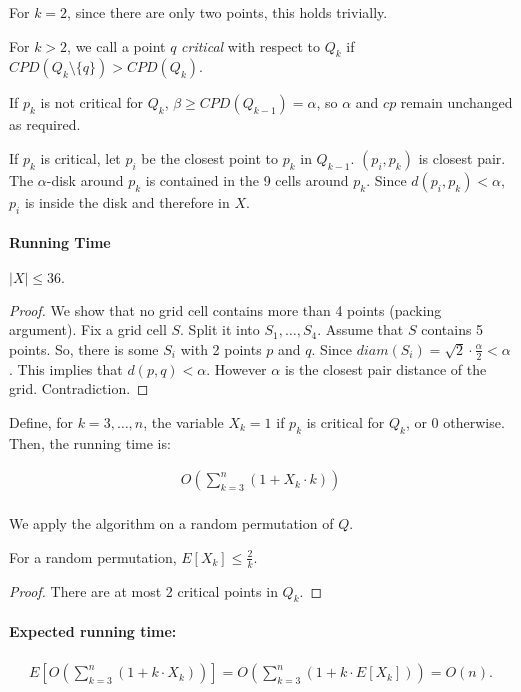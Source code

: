 For $k = 2$, since there are only two points, this holds trivially.

For $k > 2$, we call a point $q$ \emph{critical} with respect to $Q_k$ if ${CPD}(Q_k \setminus \{q\}) > {CPD}(Q_k)$.

If $p_k$ is not critical for $Q_k$, $\beta \ge {CPD}(Q_{k-1}) = \alpha$, so $\alpha$ and $cp$ remain unchanged as required.

If $p_k$ is critical, let $p_i$ be the closest point to $p_k$ in $Q_{k-1}$. $(p_i, p_k)$ is closest pair. The $\alpha$-disk around $p_k$ is contained in the 9 cells around $p_k$. Since $d(p_i, p_k) < \alpha$, $p_i$ is inside the disk and therefore in $X$. 

\paragraph{Running Time}
\begin{mylemma}
$|X| \le 36.$	
\end{mylemma}
\begin{proof}
	We show that no grid cell contains more than 4 points (packing argument).
	Fix a grid cell $S$. Split it into $S_1, \ldots, S_4$.
	Assume that $S$ contains 5 points. So, there is some $S_i$ with 2 points $p$ and $q$. Since ${diam}(S_i) = \sqrt{2} \cdot \frac{\alpha}{2} < \alpha$. This implies that $d(p,q) < \alpha$. However $\alpha$ is the closest pair distance of the grid. Contradiction.
\end{proof}

Define, for $k=3, \ldots, n$, the variable $X_k = 1$ if $p_k$ is critical for $Q_k$, or 0 otherwise.
Then, the running time is:

\begin{align*}
O \left ( \sum\limits_{k=3}^n \left ( 1 + X_k \cdot k\right ) \right ) \\
\end{align*}

We apply the algorithm on a random permutation of $Q$.

\begin{mylemma}
For a random permutation, $E[X_k] \le \frac{2}{k}$.	
\end{mylemma}
\begin{proof}
	There are at most 2 critical points in $Q_k$.
\end{proof}

\paragraph{Expected running time:}

\begin{align*}
	E \left [O \left (\sum\limits_{k=3}^n \left (1 + k \cdot X_k \right ) \right ) \right ] = O \left (\sum\limits_{k=3}^n \left (1 + k \cdot E [X_k] \right ) \right ) = O(n).
\end{align*}





